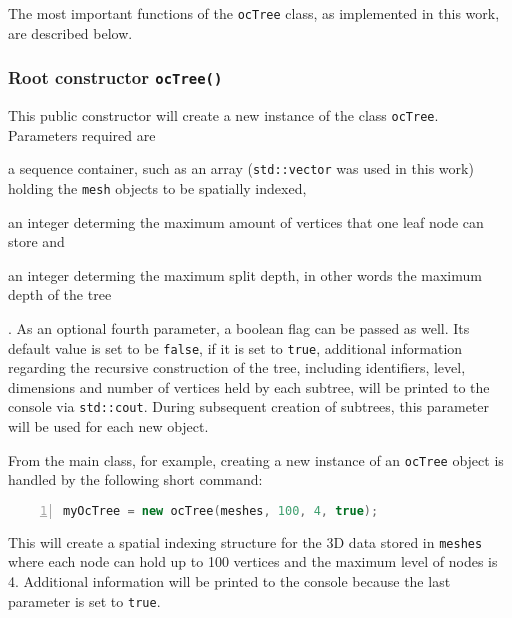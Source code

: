 The most important functions of the \texttt{ocTree} class, as implemented in this work, are described below.

\subsubsection{Root constructor \texttt{ocTree()}}
	This public constructor will create a new instance of the class \texttt{ocTree}. Parameters required are
	\begin{enumerate*}
		\item a sequence container, such as an array (\texttt{std::vector} was used in this work) holding the \texttt{mesh} objects to be spatially indexed,
		\item an integer determing the maximum amount of vertices that one leaf node can store and
		\item an integer determing the maximum split depth, in other words the maximum depth of the tree
	\end{enumerate*}.
	As an optional fourth parameter, a boolean flag can be passed as well. Its default value is set to be \texttt{false}, if it is set to \texttt{true}, additional information regarding the recursive construction of the tree, including identifiers, level, dimensions and number of vertices held by each subtree, will be printed to the console via \texttt{std::cout}. During subsequent creation of subtrees, this parameter will be used for each new object.

From the main class, for example, creating a new instance of an \texttt{ocTree} object is handled by the following short command:

\begin{minipage}{\linewidth}
\begin{lstlisting}[language=C++,numberstyle=\zebra{black!5}{white}{},numbers=left,xleftmargin=2em,tabsize=3]
myOcTree = new ocTree(meshes, 100, 4, true);
\end{lstlisting}
\end{minipage}

This will create a spatial indexing structure for the 3D data stored in \texttt{meshes} where each node can hold up to 100 vertices and the maximum level of nodes is 4. Additional information will be printed to the console because the last parameter is set to \texttt{true}.

